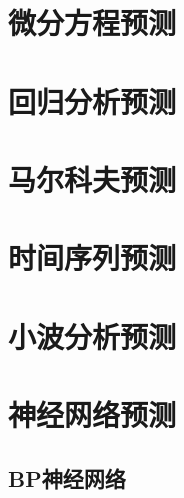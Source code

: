 \documentclass[openany]{progbookcn}
\begin{document}
\section{微分方程预测}
\section{回归分析预测}
\section{马尔科夫预测}
\section{时间序列预测}
\section{小波分析预测}
\section{神经网络预测}
\subsection{BP神经网络}
\end{document}
